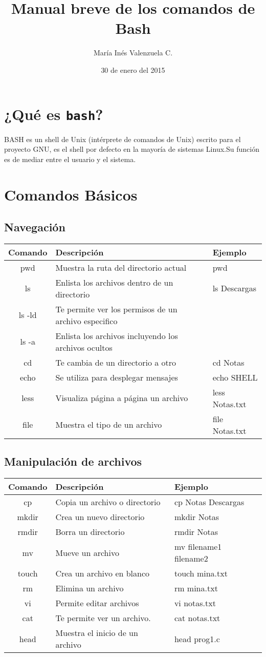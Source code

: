 \documentclass[12pt]{article}
\title{Manual breve de los comandos de Bash}
\author{ María Inés Valenzuela C.}
\date{30 de enero del 2015}
\begin{document}
\maketitle
\section{¿Qué es {\tt bash}?}
BASH es un shell de Unix (intérprete de comandos de Unix) escrito para el proyecto GNU, es el shell por defecto en la mayoría de sistemas Linux.Su función es de mediar entre el usuario y el sistema.
\section{Comandos Básicos}
\subsection{Navegación}
\begin{tabular}{|c|l|l|}
\hline
Comando & Descripción & Ejemplo \\
\hline
pwd  & Muestra la ruta del directorio actual &  pwd \\ \hline
ls & Enlista los archivos dentro de un directorio & ls Descargas \\ \hline
ls -ld & Te permite ver los permisos de un archivo especifico & \\ \hline
ls -a & Enlista los archivos incluyendo los archivos ocultos & \\ \hline
cd & Te cambia de un directorio a otro & cd Notas \\
\hline
echo & Se utiliza para desplegar mensajes & echo SHELL \\ \hline
less & Visualiza página a página un archivo & less Notas.txt \\ \hline
file & Muestra el tipo de un archivo & file Notas.txt  \\ \hline
\end{tabular}
\subsection{Manipulación de archivos}
\begin{tabular}{|c|l|l|}
\hline
Comando & Descripción & Ejemplo \\
\hline
cp & Copia un archivo o directorio & cp Notas Descargas \\ \hline
mkdir &Crea un nuevo directorio & mkdir Notas \\ \hline
rmdir & Borra un directorio & rmdir Notas \\ \hline
mv & Mueve un archivo & mv filename1 filename2 \\ \hline
touch & Crea un archivo en blanco & touch mina.txt \\ \hline
rm & Elimina un archivo & rm mina.txt \\ \hline
vi & Permite editar archivos & vi notas.txt \\ \hline
cat & Te permite ver un archivo. & cat notas.txt\\ \hline
head & Muestra el inicio de un archivo & head prog1.c \\ \hline
\end{tabular}
\end{document}

